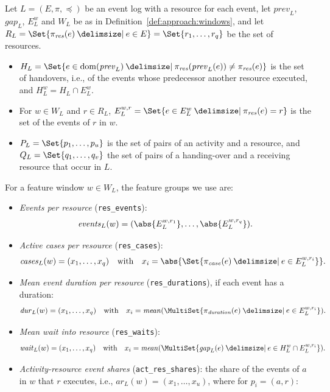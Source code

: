 \begin{definition}
	\label{def:approach:resource}
	Let $L = (E, \pi, \preceq)$ be an event log with a resource for each event, let $\mathit{prev}_L$, $\mathit{gap}_L$, $E^w_L$ and $W_L$ be as in Definition~\ref{def:approach:windows}, and let $R_L = \Set{\pi_{\mathit{res}}(e) \given e \in E} = \Set{r_1, \dots, r_q}$ be the set of resources.
	\begin{itemize}
		\item $H_L = \Set{e \in \dom(\mathit{prev}_L) \given \pi_{\mathit{res}}(\mathit{prev}_L(e)) \neq \pi_{\mathit{res}}(e)}$ is the set of handovers, i.e., of the events whose predecessor another resource executed, and $H^w_L = H_L \cap E^w_L$.
		\item For $w \in W_L$ and $r \in R_L$, $E^{w,r}_L = \Set{e \in E^w_L \given \pi_{\mathit{res}}(e) = r}$ is the set of the events of $r$ in $w$.
		\item $P_L = \Set{p_1, \dots, p_u}$ is the set of pairs of an activity and a resource, and $Q_L = \Set{q_1, \dots, q_v}$ the set of pairs of a handing-over and a receiving resource that occur in $L$.
	\end{itemize}
	For a feature window $w \in W_L$, the feature groups we use are:
	\begin{itemize}
		\item \emph{Events per resource} (\texttt{res\_events}):
		      \[
			      \mathit{events}_L(w) = (\abs{E^{w,r_1}_L}, \dots, \abs{E^{w,r_q}_L}).
		      \]
		\item \emph{Active cases per resource} (\texttt{res\_cases}):
		      \[
			      \mathit{cases}_L(w) = (x_1, \dots, x_q) \quad\text{with}\quad x_i = \abs{\Set{\pi_{\mathit{case}}(e) \given e \in E^{w,r_i}_L}}.
		      \]
		\item \emph{Mean event duration per resource} (\texttt{res\_durations}), if each event has a duration:
		      \[
			      \mathit{dur}_L(w) = (x_1, \dots, x_q) \quad\text{with}\quad x_i = \mathit{mean}(\MultiSet{\pi_{\mathit{duration}}(e) \given e \in E^{w,r_i}_L}).
		      \]
		\item \emph{Mean wait into resource} (\texttt{res\_waits}):
		      \[
			      \mathit{wait}_L(w) = (x_1, \dots, x_q) \quad\text{with}\quad x_i = \mathit{mean}(\MultiSet{\mathit{gap}_L(e) \given e \in H^w_L \cap E^{w,r_i}_L}).
		      \]
		\item \emph{Activity-resource event shares} (\texttt{act\_res\_shares}): the share of the events of $a$ in $w$ that $r$ executes, i.e., $\mathit{ar}_L(w) = (x_1, \dots, x_u)$, where for $p_i = (a, r)$:

\end{itemize}
\end{definition}
